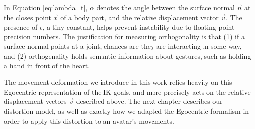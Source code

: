 In Equation \ref{eq:lambda_t}, $\alpha$ denotes the angle between the surface normal $\vec{n}$ at the closes point $\vec{x}$ of a body part, and the relative displacement vector $\vec{v}$. The presence of $\epsilon$, a tiny constant, helps prevent instability due to floating point precision numbers. The justification for measuring orthogonality is that (1) if a surface normal points at a joint, chances are they are interacting in some way, and (2) orthogonality holds semantic information about gestures, such as holding a hand in front of the heart.

The movement deformation we introduce in this work relies heavily on this Egocentric representation of the IK goals, and more precisely acts on the relative displacement vectors $\vec{v}$ described above. The next chapter describes our distortion model, as well as exactly how we adapted the Egocentric formalism in order to apply this distortion to an avatar's movements.